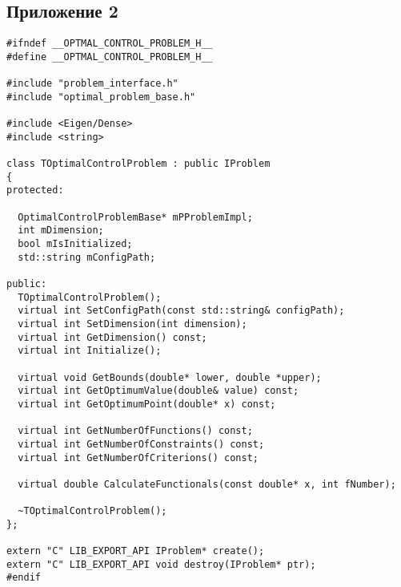 \subsection{Приложение 2}
\label{attach2}
\begin{lstlisting}[frame=single]
#ifndef __OPTMAL_CONTROL_PROBLEM_H__
#define __OPTMAL_CONTROL_PROBLEM_H__

#include "problem_interface.h"
#include "optimal_problem_base.h"

#include <Eigen/Dense>
#include <string>

class TOptimalControlProblem : public IProblem
{
protected:

  OptimalControlProblemBase* mPProblemImpl;
  int mDimension;
  bool mIsInitialized;
  std::string mConfigPath;

public:
  TOptimalControlProblem();
  virtual int SetConfigPath(const std::string& configPath);
  virtual int SetDimension(int dimension);
  virtual int GetDimension() const;
  virtual int Initialize();

  virtual void GetBounds(double* lower, double *upper);
  virtual int GetOptimumValue(double& value) const;
  virtual int GetOptimumPoint(double* x) const;

  virtual int GetNumberOfFunctions() const;
  virtual int GetNumberOfConstraints() const;
  virtual int GetNumberOfCriterions() const;

  virtual double CalculateFunctionals(const double* x, int fNumber);

  ~TOptimalControlProblem();
};

extern "C" LIB_EXPORT_API IProblem* create();
extern "C" LIB_EXPORT_API void destroy(IProblem* ptr);
#endif
\end{lstlisting}
